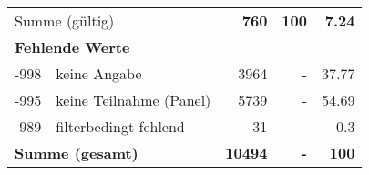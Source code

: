 \begin{longtable}{lXrrr}
     \midrule
     \multicolumn{2}{l}{Summe (gültig)} &
       \textbf{\num{760}} &
     \textbf{\num{100}} &
       \textbf{\num[round-mode=places,round-precision=2]{7.24}} \\
     \multicolumn{5}{l}{\textbf{Fehlende Werte}}\\
       -998 &
       keine Angabe &
         \num{3964} &
        - &
         \num[round-mode=places,round-precision=2]{37.77} \\
       -995 &
       keine Teilnahme (Panel) &
         \num{5739} &
        - &
         \num[round-mode=places,round-precision=2]{54.69} \\
       -989 &
       filterbedingt fehlend &
         \num{31} &
        - &
         \num[round-mode=places,round-precision=2]{0.3} \\
     \midrule
     \multicolumn{2}{l}{\textbf{Summe (gesamt)}} &
          \textbf{\num{10494}} &
        \textbf{-} &
        \textbf{\num{100}} \\
     \bottomrule
     \end{longtable}
     
